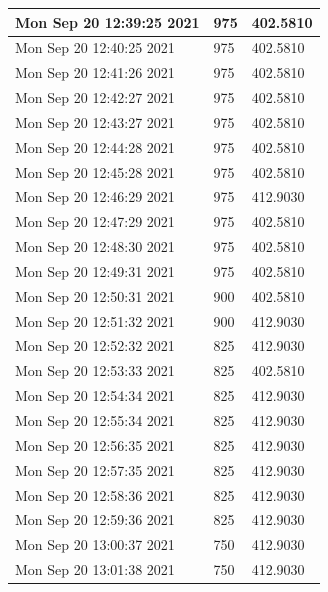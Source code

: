 \begin{longtable}{|l|l|l|}
Mon Sep 20 12:39:25 2021 &                975 &        402.5810 \\ \hline
Mon Sep 20 12:40:25 2021 &                975 &        402.5810 \\ \hline
Mon Sep 20 12:41:26 2021 &                975 &        402.5810 \\ \hline
Mon Sep 20 12:42:27 2021 &                975 &        402.5810 \\ \hline
Mon Sep 20 12:43:27 2021 &                975 &        402.5810 \\ \hline
Mon Sep 20 12:44:28 2021 &                975 &        402.5810 \\ \hline
Mon Sep 20 12:45:28 2021 &                975 &        402.5810 \\ \hline
Mon Sep 20 12:46:29 2021 &                975 &        412.9030 \\ \hline
Mon Sep 20 12:47:29 2021 &                975 &        402.5810 \\ \hline
Mon Sep 20 12:48:30 2021 &                975 &        402.5810 \\ \hline
Mon Sep 20 12:49:31 2021 &                975 &        402.5810 \\ \hline
Mon Sep 20 12:50:31 2021 &                900 &        402.5810 \\ \hline
Mon Sep 20 12:51:32 2021 &                900 &        412.9030 \\ \hline
Mon Sep 20 12:52:32 2021 &                825 &        412.9030 \\ \hline
Mon Sep 20 12:53:33 2021 &                825 &        402.5810 \\ \hline
Mon Sep 20 12:54:34 2021 &                825 &        412.9030 \\ \hline
Mon Sep 20 12:55:34 2021 &                825 &        412.9030 \\ \hline
Mon Sep 20 12:56:35 2021 &                825 &        412.9030 \\ \hline
Mon Sep 20 12:57:35 2021 &                825 &        412.9030 \\ \hline
Mon Sep 20 12:58:36 2021 &                825 &        412.9030 \\ \hline
Mon Sep 20 12:59:36 2021 &                825 &        412.9030 \\ \hline
Mon Sep 20 13:00:37 2021 &                750 &        412.9030 \\ \hline
Mon Sep 20 13:01:38 2021 &                750 &        412.9030 \\ \hline

\end{longtable}
